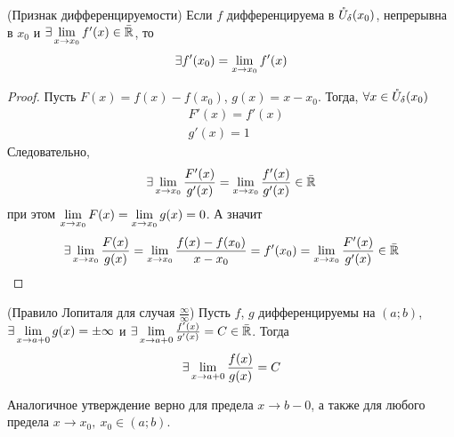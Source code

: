 \begin{corollary} (Признак дифференцируемости)
	Если $f$ дифференцируема в $\mathring{U}_\delta(x_0)$, непрерывна в $x_0$ и $\exists \lim\limits_{x \to x_0} f'(x) \in \bar{\mathbb{R}}$, то
	\[
	\exists f'(x_0) = \lim\limits_{x \to x_0} f'(x)
	\]
\end{corollary}

\begin{proof}
	Пусть $F(x) = f(x) - f(x_0)$, $g(x) = x - x_0$. Тогда, $\forall x \in \mathring{U}_\delta(x_0)$
	\begin{align*}
	&F'(x) = f'(x)
	\\
	&g'(x) = 1
	\end{align*}
	Следовательно,
	\[
	\exists \lim\limits_{x \to x_0} \frac{F'(x)}{g'(x)} = \lim\limits_{x \to x_0} \frac{f'(x)}{g'(x)} \in \bar{\mathbb{R}}
	\]
	при этом $\lim\limits_{x \to x_0} F(x) = \lim\limits_{x \to x_0} g(x) = 0$. А значит
	\[
	\exists \lim\limits_{x \to x_0} \frac{F(x)}{g(x)} = \lim\limits_{x \to x_0} \frac{f(x) - f(x_0)}{x - x_0} = f'(x_0) = \lim\limits_{x \to x_0} \frac{F'(x)}{g'(x)} \in \bar{\mathbb{R}}
	\]
\end{proof}

\begin{theorem} (Правило Лопиталя для случая $\frac{\infty}{\infty}$)
	Пусть $f$, $g$ дифференцируемы на $(a; b)$, $\exists \lim\limits_{x \to a + 0} g(x) = \pm \infty$ и $\exists \lim\limits_{x \to a + 0} \frac{f'(x)}{g'(x)} = C \in \bar{\mathbb{R}}$. Тогда
	\[
		\exists \lim\limits_{x \to a + 0} \frac{f(x)}{g(x)} = C
	\]
\end{theorem}

\begin{note}
	Аналогичное утверждение верно для предела $x \to b-0$, а также для любого предела $x \to x_0,\ x_0 \in (a; b)$.
\end{note}

